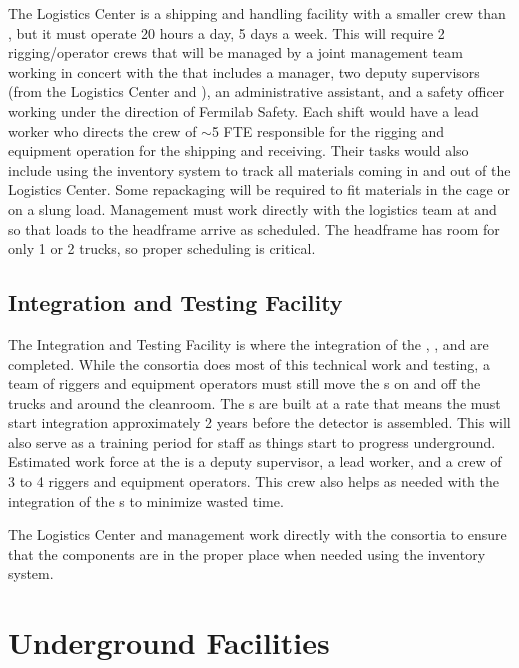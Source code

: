 The Logistics Center is a shipping and handling facility with a
smaller crew than , but it must operate 20 hours a day, 5 days a week.
This will require 2 rigging/operator crews that will be managed by a
joint management team working in concert with the  that includes 
a manager, two deputy supervisors (from the Logistics Center and ), an
administrative assistant, and a safety officer working under the direction
of Fermilab Safety.  Each shift would have a lead worker who
directs the crew of $\sim$5 FTE  responsible for the rigging and
equipment operation for the shipping and receiving.  Their tasks would
also include using the inventory system to track all materials
coming in and out of the Logistics Center. Some repackaging will be
required to fit materials in the cage or on a slung load.  Management must work directly with the  logistics team at \surf and
 so that loads to the headframe arrive as scheduled.  The headframe has
room for only 1 or 2 trucks, so proper scheduling is
critical.

\subsection{Integration and Testing Facility}

The Integration and Testing Facility is where the integration of the
, , and  are completed. While the
consortia does most of this technical work and testing,  a team of riggers and equipment operators must still move the s
on and off the trucks and around the cleanroom.  The  s are
built at a rate that means the  must start integration approximately 2
years before the detector is assembled.  This will also serve as a
training period for  staff as things
start to progress underground.  Estimated work force at the  is a
deputy supervisor, a lead worker, and a crew of 3 to 4 riggers and equipment
operators.  This crew also helps as needed with the integration of the
s to minimize wasted time.

The Logistics Center and  management work directly with the
consortia to ensure that the components are in the proper place when
needed using the inventory system.
  

\section{Underground Facilities}

